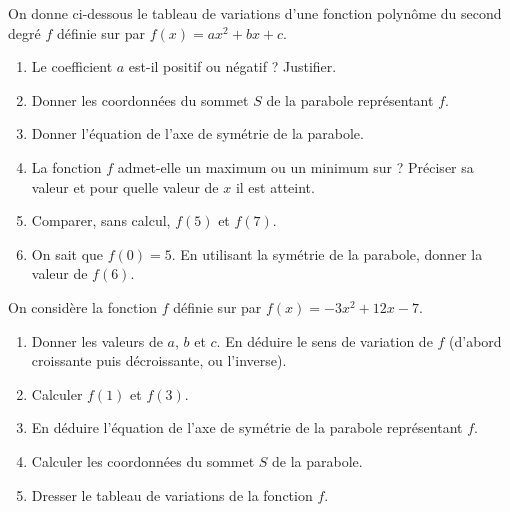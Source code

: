 \documentclass[11pt,a4paper]{book}
\begin{document}
On donne ci-dessous le tableau de variations d'une fonction polynôme du second degré $f$ définie sur \R par $f(x)=ax^2+bx+c$.

\begin{center}
\end{center}

\begin{enumerate}[label=\textbf{\arabic*)}]
	\item Le coefficient $a$ est-il positif ou négatif ? Justifier.
	\item Donner les coordonnées du sommet $S$ de la parabole représentant $f$.
	\item Donner l'équation de l'axe de symétrie de la parabole.
	\item La fonction $f$ admet-elle un maximum ou un minimum sur \R ? Préciser sa valeur et pour quelle valeur de $x$ il est atteint.
	\item Comparer, sans calcul, $f(5)$ et $f(7)$.
	\item On sait que $f(0)=5$. En utilisant la symétrie de la parabole, donner la valeur de $f(6)$.
\end{enumerate}

\exerciceDS{}

On considère la fonction $f$ définie sur \R par $f(x)=-3x^2+12x-7$.

\begin{enumerate}[label=\textbf{\arabic*)}]
	\item Donner les valeurs de $a$, $b$ et $c$. En déduire le sens de variation de $f$ (d'abord croissante puis décroissante, ou l'inverse).
	\item Calculer $f(1)$ et $f(3)$.
	\item En déduire l'équation de l'axe de symétrie de la parabole représentant $f$.
	\item Calculer les coordonnées du sommet $S$ de la parabole.
	\item Dresser le tableau de variations de la fonction $f$.
\end{enumerate}
\end{document}
